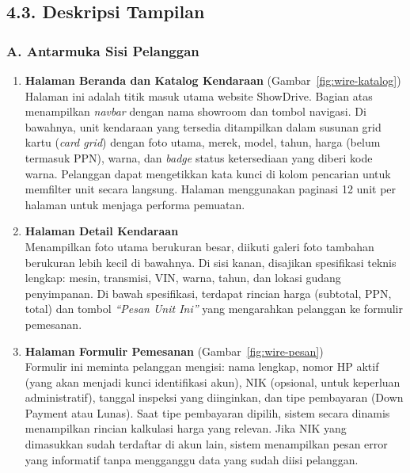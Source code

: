 \documentclass[11pt, a5paper]{article}
\begin{document}
\subsection*{4.3. Deskripsi Tampilan}

\subsubsection*{A. Antarmuka Sisi Pelanggan}

\begin{enumerate}[label=\arabic*.]
  \item \textbf{Halaman Beranda dan Katalog Kendaraan}
        (Gambar~\ref{fig:wire-katalog})\\
        Halaman ini adalah titik masuk utama website ShowDrive. Bagian atas
        menampilkan \textit{navbar} dengan nama showroom dan tombol navigasi.
        Di bawahnya, unit kendaraan yang tersedia ditampilkan dalam susunan
        grid kartu (\textit{card grid}) dengan foto utama, merek, model, tahun,
        harga (belum termasuk PPN), warna, dan \textit{badge} status
        ketersediaan yang diberi kode warna. Pelanggan dapat mengetikkan kata
        kunci di kolom pencarian untuk memfilter unit secara langsung.
        Halaman menggunakan paginasi 12 unit per halaman untuk menjaga performa
        pemuatan.

  \item \textbf{Halaman Detail Kendaraan}\\
        Menampilkan foto utama berukuran besar, diikuti galeri foto tambahan
        berukuran lebih kecil di bawahnya. Di sisi kanan, disajikan spesifikasi
        teknis lengkap: mesin, transmisi, VIN, warna, tahun, dan lokasi gudang
        penyimpanan. Di bawah spesifikasi, terdapat rincian harga (subtotal,
        PPN, total) dan tombol \textit{``Pesan Unit Ini''} yang mengarahkan
        pelanggan ke formulir pemesanan.

  \item \textbf{Halaman Formulir Pemesanan}
        (Gambar~\ref{fig:wire-pesan})\\
        Formulir ini meminta pelanggan mengisi: nama lengkap, nomor HP aktif
        (yang akan menjadi kunci identifikasi akun), NIK (opsional, untuk
        keperluan administratif), tanggal inspeksi yang diinginkan, dan tipe
        pembayaran (Down Payment atau Lunas). Saat tipe pembayaran dipilih,
        sistem secara dinamis menampilkan rincian kalkulasi harga yang relevan.
        Jika NIK yang dimasukkan sudah terdaftar di akun lain, sistem
        menampilkan pesan error yang informatif tanpa mengganggu data yang
        sudah diisi pelanggan.


\end{enumerate}
\end{document}

